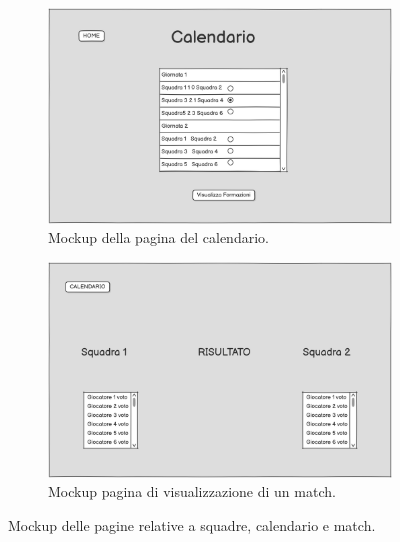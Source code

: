 \begin{figure}[H]
    \begin{subfigure}[b]{0.49\textwidth}
        \centering
        \includegraphics[width=\textwidth]{Resources/Mockups/Calendario.png}
        \caption{Mockup della pagina del calendario.}
        \label{fig:pagina_calendario}
    \end{subfigure}
    \hfill
    \begin{subfigure}[b]{0.49\textwidth}
        \centering
        \includegraphics[width=\textwidth]{Resources/Mockups/VisualizzaMatch.png}
        \caption{Mockup pagina di visualizzazione di un match.}
        \label{fig:pagina_visualizza_match}
    \end{subfigure}

    \caption{Mockup delle pagine relative a squadre, calendario e match.}
    \label{fig:mockup_parte2}
\end{figure}
\clearpage
